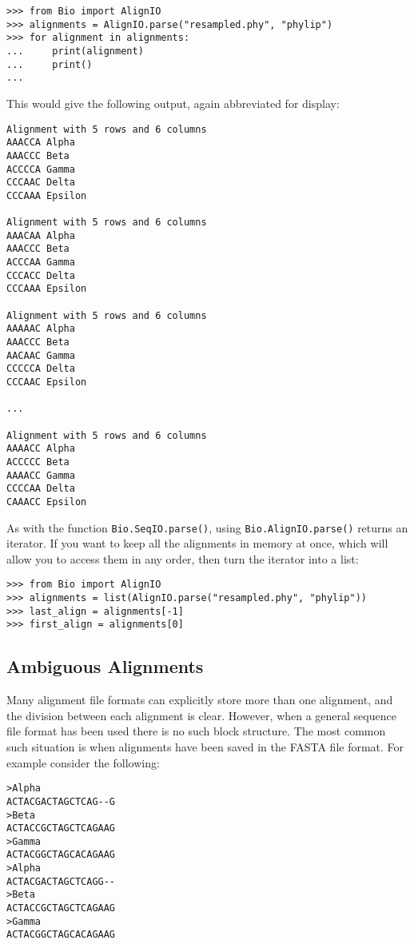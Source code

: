 \begin{verbatim}
>>> from Bio import AlignIO
>>> alignments = AlignIO.parse("resampled.phy", "phylip")
>>> for alignment in alignments:
...     print(alignment)
...     print()
...
\end{verbatim}

\noindent This would give the following output, again abbreviated for display:

\begin{verbatim}
Alignment with 5 rows and 6 columns
AAACCA Alpha
AAACCC Beta
ACCCCA Gamma
CCCAAC Delta
CCCAAA Epsilon

Alignment with 5 rows and 6 columns
AAACAA Alpha
AAACCC Beta
ACCCAA Gamma
CCCACC Delta
CCCAAA Epsilon

Alignment with 5 rows and 6 columns
AAAAAC Alpha
AAACCC Beta
AACAAC Gamma
CCCCCA Delta
CCCAAC Epsilon

...

Alignment with 5 rows and 6 columns
AAAACC Alpha
ACCCCC Beta
AAAACC Gamma
CCCCAA Delta
CAAACC Epsilon
\end{verbatim}

As with the function \verb|Bio.SeqIO.parse()|, using \verb|Bio.AlignIO.parse()| returns an iterator.
If you want to keep all the alignments in memory at once, which will allow you to access them in any order, then turn the iterator into a list:

\begin{verbatim}
>>> from Bio import AlignIO
>>> alignments = list(AlignIO.parse("resampled.phy", "phylip"))
>>> last_align = alignments[-1]
>>> first_align = alignments[0]
\end{verbatim}

\subsection{Ambiguous Alignments}
\label{sec:AlignIO-count-argument}
Many alignment file formats can explicitly store more than one alignment, and the division between each alignment is clear.  However, when a general sequence file format has been used there is no such block structure.  The most common such situation is when alignments have been saved in the FASTA file format.  For example consider the following:

\begin{verbatim}
>Alpha
ACTACGACTAGCTCAG--G
>Beta
ACTACCGCTAGCTCAGAAG
>Gamma
ACTACGGCTAGCACAGAAG
>Alpha
ACTACGACTAGCTCAGG--
>Beta
ACTACCGCTAGCTCAGAAG
>Gamma
ACTACGGCTAGCACAGAAG
\end{verbatim}

